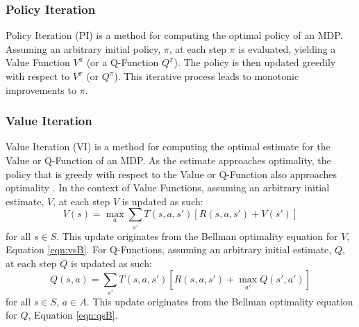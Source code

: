 \subsubsection{Policy Iteration}
Policy Iteration (PI) \cite{Bellman:1957, howard:dp} is a method for computing the optimal policy of an MDP. Assuming an arbitrary initial policy, $\pi$, at each step $\pi$ is evaluated, yielding a Value Function $V^\pi$ (or a Q-Function $Q^\pi$). The policy is then updated greedily with respect to $V^\pi$ (or $Q^\pi$). This iterative process leads to monotonic improvements to $\pi$.
\subsubsection{Value Iteration}
Value Iteration (VI) \cite{Bellman:1957} is a method for computing the optimal estimate for the Value or Q-Function of an MDP. As the estimate approaches optimality, the policy that is greedy with respect to the Value or Q-Function also approaches optimality \cite{series/synthesis/2010Szepesvari}.
In the context of Value Functions, assuming an arbitrary initial estimate, $V$, at each step $V$ is updated as such:
\begin{equation}
\label{eqn:vupdate}
V(s) = \max_a\sum_{s'}T(s, a, s')[R(s, a, s')+V(s')]
\end{equation}
for all $s \in S$. This update originates from the Bellman optimality equation for $V$, Equation \ref{eqn:vsB}.
For Q-Functions, assuming an arbitrary initial estimate, $Q$, at each step $Q$ is updated as such:
\begin{equation}
\label{eqn:qupdate}
Q(s,a) = \sum_{s'}T(s,a,s')[R(s,a,s') + \max_{a'}Q(s',a')]
\end{equation}
for all $s \in S$, $a \in A$. This update originates from the Bellman optimality equation for $Q$, Equation \ref{eqn:qsB}.

